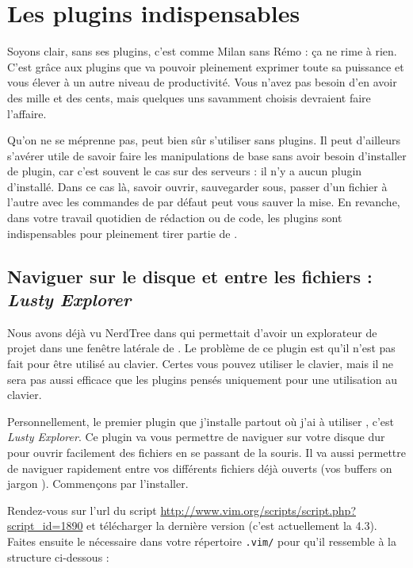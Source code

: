 \chapter{Les plugins indispensables}

Soyons clair, \vim sans ses plugins, c'est comme Milan sans Rémo : ça ne rime à rien. C'est grâce aux plugins que \vim va pouvoir pleinement exprimer toute sa puissance et vous élever à un autre niveau de productivité. Vous n'avez pas besoin d'en avoir des mille et des cents, mais quelques uns savamment choisis devraient faire l'affaire.

Qu'on ne se méprenne pas, \vim peut bien sûr s'utiliser sans plugins. Il peut d'ailleurs s'avérer utile de savoir faire les manipulations de base sans avoir besoin d'installer de plugin, car c'est souvent le cas sur des serveurs : il n'y a aucun plugin d'installé. Dans ce cas là, savoir ouvrir, sauvegarder sous, passer d'un fichier à l'autre avec les commandes de \vim par défaut peut vous sauver la mise. En revanche, dans votre travail quotidien de rédaction ou de code, les plugins sont indispensables pour pleinement tirer partie de \vim.

\section{Naviguer sur le disque et entre les fichiers : \emph{Lusty Explorer}}

Nous avons déjà vu NerdTree dans  qui permettait d'avoir un explorateur de projet dans une fenêtre latérale de \vim. Le problème de ce plugin est qu'il n'est pas fait pour être utilisé au clavier. Certes vous pouvez utiliser le clavier, mais il ne sera pas aussi efficace que les plugins pensés uniquement pour une utilisation au clavier.

Personnellement, le premier plugin que j'installe partout où j'ai à utiliser \vim, c'est \emph{Lusty Explorer}. Ce plugin va vous permettre de naviguer sur votre disque dur pour ouvrir facilement des fichiers en se passant de la souris. Il va aussi permettre de naviguer rapidement entre vos différents fichiers déjà ouverts (vos buffers on jargon \vim). Commençons par l'installer.

Rendez-vous sur l'url du script \url{http://www.vim.org/scripts/script.php?script\_id=1890} et télécharger la dernière version (c'est actuellement la 4.3). Faites ensuite le nécessaire dans votre répertoire \Verb|.vim/| pour qu'il ressemble à la structure ci-dessous :

